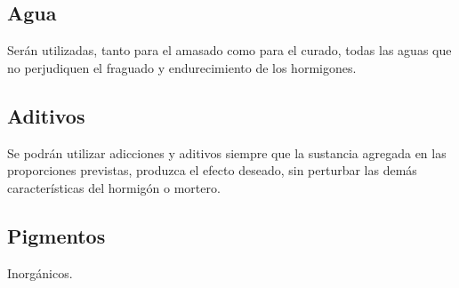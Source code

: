 \subsection{Agua}
Serán utilizadas, tanto para el amasado como para el curado, todas las aguas que no perjudiquen el fraguado y endurecimiento de los hormigones.

\subsection{Aditivos}
Se podrán utilizar adicciones y aditivos siempre que la sustancia agregada en las proporciones previstas, produzca el efecto deseado, sin perturbar las demás características del hormigón o mortero.

\subsection{Pigmentos}
Inorgánicos.
